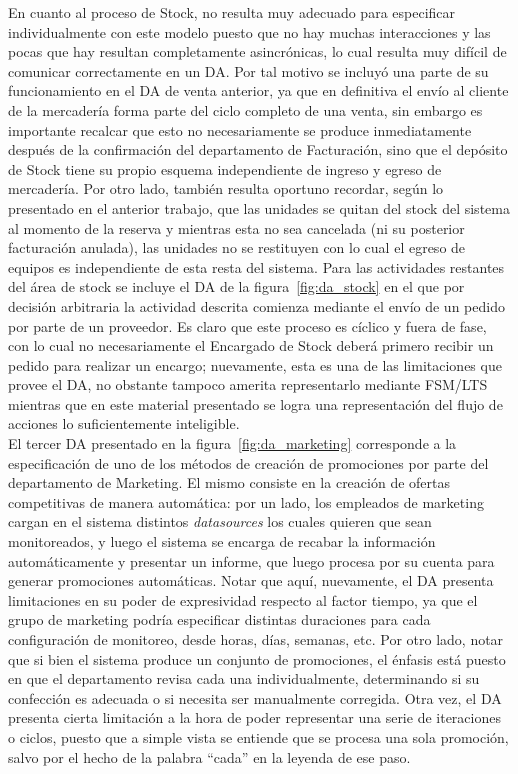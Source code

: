 \indent En cuanto al proceso de Stock, no resulta muy adecuado para especificar individualmente con este modelo puesto que no hay muchas interacciones y las pocas que hay resultan completamente asincrónicas, lo cual resulta muy difícil de comunicar correctamente en un DA. Por tal motivo se incluyó una parte de su funcionamiento en el DA de venta anterior, ya que en definitiva el envío al cliente de la mercadería forma parte del ciclo completo de una venta, sin embargo es importante recalcar que esto no necesariamente se produce inmediatamente después de la confirmación del departamento de Facturación, sino que el depósito de Stock tiene su propio esquema independiente de ingreso y egreso de mercadería. Por otro lado, también resulta oportuno recordar, según lo presentado en el anterior trabajo, que las unidades se quitan del stock del sistema al momento de la reserva y mientras esta no sea cancelada (ni su posterior facturación anulada), las unidades no se restituyen con lo cual el egreso de equipos es independiente de esta resta del sistema. Para las actividades restantes del área de stock se incluye el DA de la figura~\ref{fig:da_stock} en el que por decisión arbitraria la actividad descrita comienza mediante el envío de un pedido por parte de un proveedor. Es claro que este proceso es cíclico y fuera de fase, con lo cual no necesariamente el Encargado de Stock deberá primero recibir un pedido para realizar un encargo; nuevamente, esta es una de las limitaciones que provee el DA, no obstante tampoco amerita representarlo mediante FSM/LTS mientras que en este material presentado se logra una representación del flujo de acciones lo suficientemente inteligible.\\
\indent El tercer DA presentado en la figura~\ref{fig:da_marketing} corresponde a la especificación de uno de los métodos de creación de promociones por parte del departamento de Marketing. El mismo consiste en la creación de ofertas competitivas de manera automática: por un lado, los empleados de marketing cargan en el sistema distintos \textsl{datasources} los cuales quieren que sean monitoreados, y luego el sistema se encarga de recabar la información automáticamente y presentar un informe, que luego procesa por su cuenta para generar promociones automáticas. Notar que aquí, nuevamente, el DA presenta limitaciones en su poder de expresividad respecto al factor tiempo, ya que el grupo de marketing podría especificar distintas duraciones para cada configuración de monitoreo, desde horas, días, semanas, etc. Por otro lado, notar que si bien el sistema produce un conjunto de promociones, el énfasis está puesto en que el departamento revisa cada una individualmente, determinando si su confección es adecuada o si necesita ser manualmente corregida. Otra vez, el DA presenta cierta limitación a la hora de poder representar una serie de iteraciones o ciclos, puesto que a simple vista se entiende que se procesa una sola promoción, salvo por el hecho de la palabra ``cada'' en la leyenda de ese paso.\\

